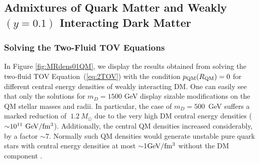 \documentclass[universe,article,accept,moreauthors,pdftex]{Definitions/mdpi}
\begin{document}


\subsection{Admixtures of Quark Matter and Weakly $(y=0.1)$ Interacting Dark Matter}

\subsubsection{Solving the Two-Fluid TOV Equations}


In Figure \ref{fig:MRdens01QM}, we display  the results obtained from solving the two-fluid TOV \linebreak Equation~(\ref{eq:2TOV}) with the condition $p_{\rm QM}(R_{\rm QM})=0$ for different central energy densities of weakly interacting DM. One can easily see that only the solutions for $m_{D}=1500$ GeV display sizable modifications on the QM stellar masses and radii. In particular, the case of $m_{D}=500$~GeV suffers a marked reduction of $~1.2~M_{\odot}$ due to the very high DM central energy densities (${\sim}10^{11}~{\rm GeV/fm^{3}}$). Additionally, the central QM densities increased considerably, by a factor $\sim$7. Normally such QM densities would generate unstable pure quark stars with central energy densities at most $\sim${1}${\rm GeV/fm^{3}}$ without the DM component .
\end{document}
